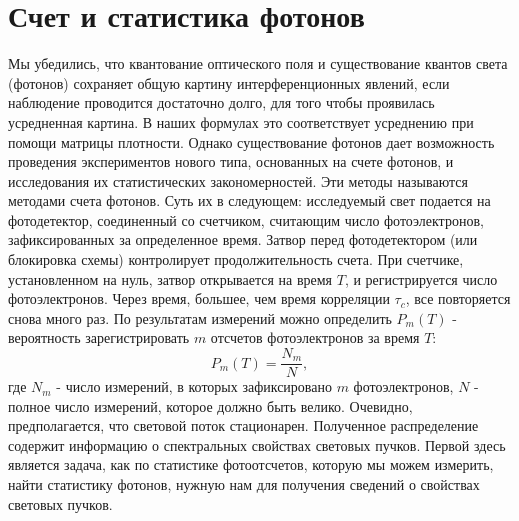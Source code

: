 \section{Счет и статистика фотонов}
Мы убедились, что квантование оптического поля и существование квантов
света (фотонов) сохраняет общую картину интерференционных
явлений, если наблюдение проводится достаточно долго, для того
чтобы проявилась усредненная картина. В наших формулах это
соответствует усреднению при помощи матрицы плотности. Однако
существование фотонов дает возможность проведения
экспериментов нового типа, основанных на счете фотонов, и
исследования их статистических закономерностей. Эти методы
называются методами счета фотонов. Суть их в следующем:
исследуемый свет подается на фотодетектор, соединенный со
счетчиком, считающим число фотоэлектронов, зафиксированных за
определенное время. Затвор перед фотодетектором (или
блокировка схемы) контролирует продолжительность счета. При
счетчике, установленном на нуль, затвор открывается на время
$T$,  и регистрируется число фотоэлектронов. Через время,
большее, чем время корреляции $\tau_c$,  все повторяется снова много
раз. По результатам измерений можно определить $P_m\left(T\right)$ -
вероятность зарегистрировать $m$  отсчетов фотоэлектронов за
время $T$: 
\begin{equation}
P_m\left(T\right) = \frac{N_m}{N},
\label{eqCh4_40}
\end{equation}
где $N_m$ - число измерений, в которых зафиксировано $m$
фотоэлектронов, $N$ - полное число измерений, которое должно быть
велико. Очевидно, предполагается, что световой поток
стационарен. Полученное распределение содержит информацию о
спектральных свойствах световых пучков. Первой здесь является задача,
как по статистике фотоотсчетов, которую мы можем измерить, найти
статистику фотонов, нужную нам для получения сведений о свойствах
световых пучков.  
